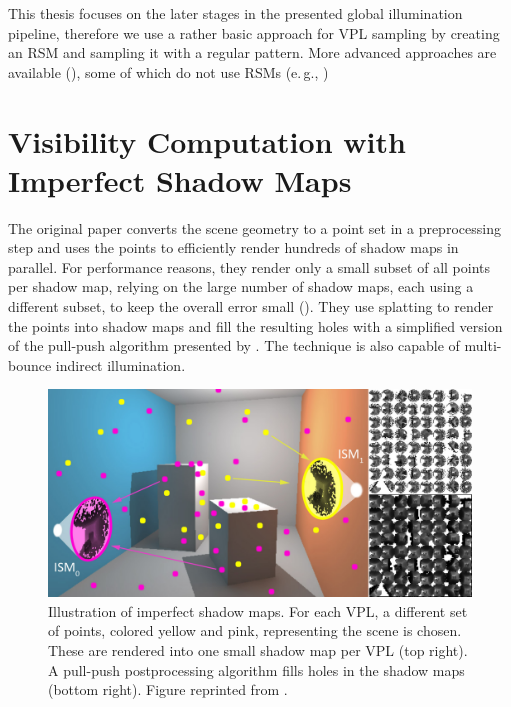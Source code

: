 This thesis focuses on the later stages in the presented global illumination pipeline, therefore we use a rather basic approach for VPL sampling by creating an RSM and sampling it with a regular pattern. More advanced approaches are available (), some of which do not use RSMs (e.\,g., \cite{hedman2016sequential})


\section{Visibility Computation with Imperfect Shadow Maps}
\label{sec:concept:ism}

The original paper \citep{ritschel2008ism} converts the scene geometry to a point set in a preprocessing step and uses the points to efficiently render hundreds of shadow maps in parallel. For performance reasons, they render only a small subset of all points per shadow map, relying on the large number of shadow maps, each using a different subset, to keep the overall error small (). They use splatting to render the points into shadow maps and fill the resulting holes with a simplified version of the pull-push algorithm presented by \citet{Marroquim:2007:reconstruction}. The technique is also capable of multi-bounce indirect illumination.

\begin{figure}[htb]
\centering
    \includegraphics[width=\textwidth]{graphics/ism_ritschel_08}
  \caption{Illustration of imperfect shadow maps. For each VPL, a different set of points, colored yellow and pink, representing the scene is chosen. These are rendered into one small shadow map per VPL (top right). A pull-push postprocessing algorithm fills holes in the shadow maps (bottom right). Figure reprinted from \citet{ritschel2008ism}.}
  \label{fig:concept:ism_ritschel_08}
\end{figure}

